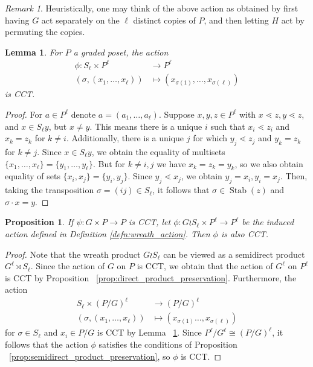 \documentclass[smallextended, envcountsame, numbook]{svjour3}
\theoremstyle{plain}
\newtheorem{prop}[thm]{Proposition}
\newtheorem{lem}[thm]{Lemma}
\theoremstyle{definition}
\theoremstyle{remark}
\newtheorem{rmk}[thm]{Remark}
\numberwithin{equation}{section}
\newcommand\Stab{\operatorname{Stab}}
\begin{document}
\begin{rmk}
Heuristically, one may think of the above action as obtained by first having $G$ act separately on the $\ell$ distinct copies of $P$, and then letting $H$ act by permuting the copies.
\end{rmk}

\begin{lem}
\label{lem:symmetric_group_product_action}
For $P$ a graded poset, the action 
\begin{align*}
\phi\colon S_\ell \times P^\ell &\rightarrow P^\ell\\
(\sigma, (x_1,\ldots, x_\ell)) &\mapsto (x_{\sigma(1)},\ldots, x_{\sigma(\ell)})
\end{align*}
is CCT.
\end{lem}

\begin{proof}
For $a \in P^\ell$ denote $a = (a_1,\ldots, a_\ell)$. Suppose $x,y,z \in P^\ell$ with $x\lessdot z,y\lessdot z$, and $x \in S_\ell y$, but $x \neq y$. This means there is a unique $i$ such that $x_i \lessdot z_i$ and $x_k = z_k$ for $k \neq i$. Additionally, there is a unique $j$ for which $y_j \lessdot z_j$ and $y_k =z_k$ for $k \neq j$. Since $x \in S_\ell y$, we obtain the equality of multisets $\{x_1,\ldots, x_\ell\}=\{y_1,\ldots,y_\ell\}$. But for $k \neq i,j$ we have $x_k = z_k = y_k$, so we also obtain equality of sets $\{x_i,x_j\} = \{y_i,y_j\}$. Since $y_j \lessdot x_j$, we obtain $y_j = x_i,y_i = x_j$. Then, taking the transposition $\sigma  = (ij) \in S_\ell$, it follows that $\sigma \in \Stab(z)$ and $\sigma \cdot x = y$.
\end{proof}

\begin{prop}
\label{prop:wreath_preservation}
If $\psi\colon G\times P \rightarrow P$ is CCT, let $\phi\colon G\wr S_\ell \times P^\ell \rightarrow P^\ell$ be the induced action defined in Definition \ref{defn:wreath_action}. Then $\phi$ is also CCT.
\end{prop}
\begin{proof}
Note that the wreath product $G \wr S_\ell$ can be viewed as a semidirect product $G^\ell \rtimes S_\ell$. Since the action of $G$ on $P$ is CCT, we obtain that the action of $G^\ell$ on $P^\ell$ is CCT by Proposition ~\ref{prop:direct_product_preservation}.  Furthermore, the action 
\begin{align*}
S_\ell \times (P/G)^\ell &\rightarrow (P/G)^\ell \\
	(\sigma ,(x_1,\ldots, x_\ell)) &\mapsto (x_{\sigma(1)}\ldots, x_{\sigma(\ell)})
\end{align*}
 for $\sigma \in S_\ell$ and $x_i \in P/G$ is CCT by Lemma ~\ref{lem:symmetric_group_product_action}.  Since $P^\ell/G^\ell \cong (P/G)^\ell$, it follows that the action $\phi$ satisfies the conditions of Proposition ~\ref{prop:semidirect_product_preservation}, so $\phi$ is CCT.
\end{proof}
\end{document}

